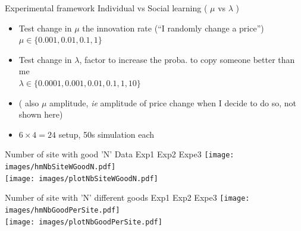 \documentclass[12pt, notes=show]{beamer}
\begin{document}
\begin{frame}{Experimental framework}
Individual  vs Social learning  ( $\mu$ vs $\lambda$ )
    \begin{itemize}
	\item Test change in $\mu$ the innovation rate (``I randomly change a price'')\\
	    \hspace{.2cm} $\mu \in \{0.001,0.01,0.1,1\}$
	\item Test change in $\lambda$, factor to increase the proba. to copy someone better than me\\
	    \hspace{.2cm} $\lambda \in \{0.0001,0.001,0.01,0.1,1,10\}$
	\item ( also $\mu$ amplitude, \emph{ie} amplitude of price change when I decide to do so, not shown here)
	\item  $ 6 \times 4 = 24$ setup, 50s simulation each
    \end{itemize}
\end{frame}


\begin{frame}{Number of site with good 'N'}
    \small
Data \hfill Exp1 \hfill Exp2 \hfill Expe3 
	\texttt{[image: images/hmNbSiteWGoodN.pdf]}\\
	\texttt{[image: images/plotNbSiteWGoodN.pdf]}\\
\end{frame}

\begin{frame}{Number of site with 'N' different goods}
    \centering
    \tiny
 Exp1 \hfill Exp2 \hfill Expe3 
	\texttt{[image: images/hmNbGoodPerSite.pdf]}\\
	\vfil
	\texttt{[image: images/plotNbGoodPerSite.pdf]}\\
\end{frame}
\end{document}
